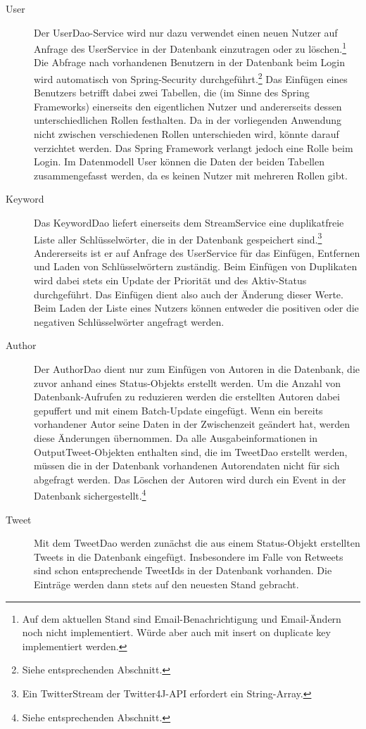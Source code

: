 \begin{description}
	\item [User] Der UserDao-Service wird nur dazu verwendet einen neuen Nutzer auf Anfrage des UserService in der Datenbank einzutragen oder zu löschen.\footnote{Auf dem aktuellen Stand sind Email-Benachrichtigung und Email-Ändern noch nicht implementiert. Würde aber auch mit insert on duplicate key implementiert werden.} Die Abfrage nach vorhandenen Benutzern in der Datenbank beim Login wird automatisch von Spring-Security durchgeführt.\footnote{Siehe entsprechenden Abschnitt.} Das Einfügen eines Benutzers betrifft dabei zwei Tabellen, die (im Sinne des Spring Frameworks) einerseits den eigentlichen Nutzer und andererseits dessen unterschiedlichen Rollen festhalten. Da in der vorliegenden Anwendung nicht zwischen verschiedenen Rollen unterschieden wird, könnte darauf verzichtet werden. Das Spring Framework verlangt jedoch eine Rolle beim Login. Im Datenmodell User können die Daten der beiden Tabellen zusammengefasst werden, da es keinen Nutzer mit mehreren Rollen gibt.
	\item [Keyword] Das KeywordDao liefert einerseits dem StreamService eine duplikatfreie Liste aller Schlüsselwörter, die in der Datenbank gespeichert sind.\footnote{Ein TwitterStream der Twitter4J-API erfordert ein String-Array.} Andererseits ist er auf Anfrage des UserService für das Einfügen, Entfernen und Laden von Schlüsselwörtern zuständig. Beim Einfügen von Duplikaten wird dabei stets ein Update der Priorität und des Aktiv-Status durchgeführt. Das Einfügen dient also auch der Änderung dieser Werte. Beim Laden der Liste eines Nutzers können entweder die positiven oder die negativen Schlüsselwörter angefragt werden.
	\item [Author] Der AuthorDao dient nur zum Einfügen von Autoren in die Datenbank, die zuvor anhand eines Status-Objekts erstellt werden. Um die Anzahl von Datenbank-Aufrufen zu reduzieren werden die erstellten Autoren dabei gepuffert und mit einem Batch-Update eingefügt. Wenn ein bereits vorhandener Autor seine Daten in der Zwischenzeit geändert hat, werden diese Änderungen übernommen. Da alle Ausgabeinformationen in OutputTweet-Objekten enthalten sind, die im TweetDao erstellt werden, müssen die in der Datenbank vorhandenen Autorendaten nicht für sich abgefragt werden. Das Löschen der Autoren wird durch ein Event in der Datenbank sichergestellt.\footnote{Siehe entsprechenden Abschnitt.}
	\item [Tweet] Mit dem TweetDao werden zunächst die aus einem Status-Objekt erstellten Tweets in die Datenbank eingefügt. Insbesondere im Falle von Retweets sind schon entsprechende TweetIds in der Datenbank vorhanden. Die Einträge werden dann stets auf den neuesten Stand gebracht.
\end{description}
